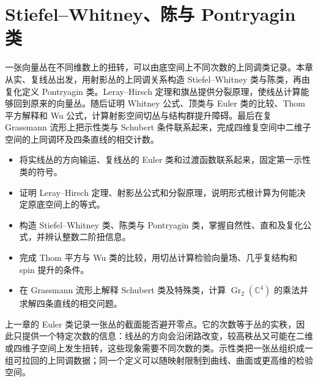 
% 
% 

\chapter{Stiefel–Whitney、陈与 Pontryagin 类}
\label{g2:ch:21}

\begin{chapterabstract}
	一张向量丛在不同维数上的扭转，可以由底空间上不同次数的上同调类记录。本章从实、复线丛出发，用射影丛的上同调关系构造 Stiefel--Whitney 类与陈类，再由复化定义 Pontryagin 类。Leray--Hirsch 定理和旗丛提供分裂原理，使线丛计算能够回到原来的向量丛。随后证明 Whitney 公式、顶类与 Euler 类的比较、Thom 平方解释和 Wu 公式，计算射影空间切丛与结构群提升障碍。最后在复 Grassmann 流形上把示性类与 Schubert 条件联系起来，完成四维复空间中二维子空间的上同调环及四条直线的相交计数。
\end{chapterabstract}

\begin{learninggoals}
	\begin{itemize}
		\item 将实线丛的方向输运、复线丛的 Euler 类和过渡函数联系起来，固定第一示性类的符号。
		\item 证明 Leray--Hirsch 定理、射影丛公式和分裂原理，说明形式根计算为何能决定原底空间上的等式。
		\item 构造 Stiefel--Whitney 类、陈类与 Pontryagin 类，掌握自然性、直和及复化公式，并辨认整数二阶扭信息。
		\item 完成 Thom 平方与 Wu 类的比较，用切丛计算检验向量场、几乎复结构和 spin 提升的条件。
		\item 在 Grassmann 流形上解释 Schubert 类及特殊类，计算 \(\operatorname{Gr}_2(\mathbb C^4)\) 的乘法并求解四条直线的相交问题。
	\end{itemize}
\end{learninggoals}

上一章的 Euler 类记录一张丛的截面能否避开零点。它的次数等于丛的实秩，因此只提供一个特定次数的信息：线丛的方向会沿闭路改变，较高秩丛又可能在二维或四维子空间上发生扭转，这些现象需要不同次数的类。示性类把一张丛组织成一组可拉回的上同调数据；同一个定义可以随映射限制到曲线、曲面或更高维的检验空间。

